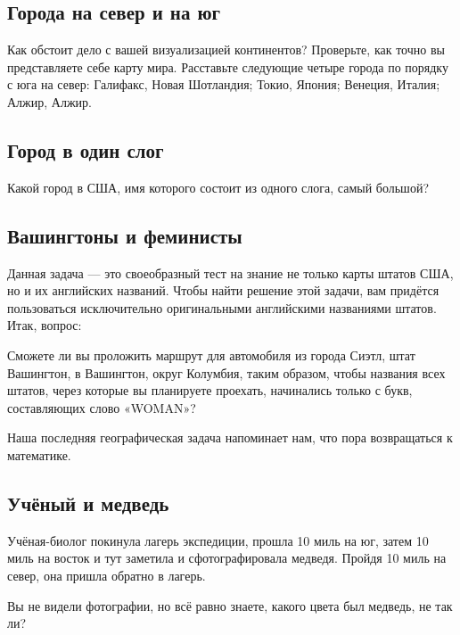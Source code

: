 \subsection*{Города на север и на юг}%

Как обстоит дело с вашей визуализацией континентов?
Проверьте, как точно вы представляете себе %
карту мира.
Расставьте следующие четыре города по порядку с юга на север: 
Галифакс, Новая Шотландия; %
Токио, Япония; %
Венеция, Италия; %
Алжир, Алжир. %

\subsection*{Город в один слог}%

Какой город в США, имя которого состоит из одного слога, самый большой? 

\subsection*{Вашингтоны и феминисты}%

Данная задача --- это своеобразный тест на знание не только карты штатов США, но и их английских названий.
Чтобы найти решение этой задачи, вам придётся пользоваться исключительно оригинальными английскими названиями штатов.
Итак, вопрос: 

Сможете ли вы проложить маршрут для автомобиля из города Сиэтл, штат Вашингтон, 
 в Вашингтон, округ Колумбия, таким образом, чтобы названия всех штатов, через которые вы планируете проехать, начинались только с букв, составляющих слово «WOMAN»?

\medskip

Наша последняя географическая задача напоминает нам, что пора возвращаться к математике. %

\subsection*{Учёный и медведь}%

Учёная-биолог покинула лагерь экспедиции, прошла 10 миль на юг, затем 10 миль на восток и тут заметила и сфотографировала медведя.
Пройдя 10 миль на север, она пришла обратно в лагерь.

\medskip

Вы не видели фотографии, но всё равно знаете, какого цвета был медведь, не так ли?
